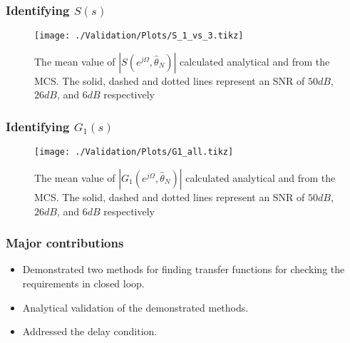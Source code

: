 \begin{frame}
	\frametitle{Identifying $S(s)$}
	\begin{figure}[tb]
		\texttt{[image: ./Validation/Plots/S\_1\_vs\_3.tikz]}
		\caption{The mean value of $|S(e^{j\Omega},\hat{\theta}_N)|$ calculated analytical and from the MCS\@. The solid, dashed and dotted lines represent an SNR of $50dB$, $26dB$, and $6dB$ respectively}\label{fig:S_1_vs_3}
	\end{figure}
\end{frame}

\begin{frame}
	\frametitle{Identifying $G_1(s)$}
	\begin{figure}[tb]
		\texttt{[image: ./Validation/Plots/G1\_all.tikz]}
		\caption{The mean value of $|G_1(e^{j\Omega},\hat{\theta}_N)|$ calculated analytical and from the MCS\@. The solid, dashed and dotted lines represent an SNR of $50dB$, $26dB$, and $6dB$ respectively}\label{fig:G1_all}
	\end{figure}
\end{frame}
\begin{frame}
	\frametitle{Major contributions}
	\begin{itemize}
		\item Demonstrated two methods for finding transfer functions for checking the requirements in closed loop.
		\item Analytical validation of the demonstrated methods.
		\item Addressed the delay condition.
	\end{itemize}
\end{frame}


